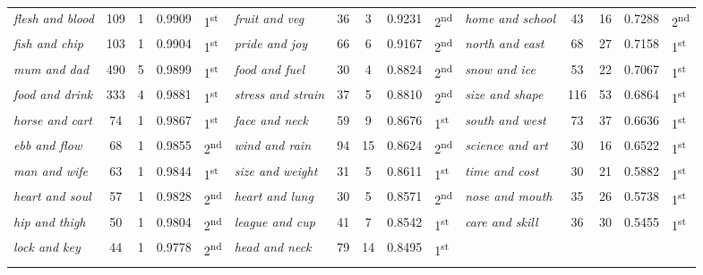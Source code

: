 \begin{table}
{\begin{tabular}[t]{l *{2}{S[table-format=3]} S[table-format=1.4] l  l *{2}{S[table-format=3]} S[table-format=1.4] l  l *{2}{S[table-format=3]} S[table-format=1.4] l}
\textit{flesh and blood} & 109 & 1 & 0.9909 & 1\textsuperscript{st} & \textit{fruit and veg} & 36 & 3 & 0.9231 & 2\textsuperscript{nd} & \textit{home and school} & 43 & 16 & 0.7288 & 2\textsuperscript{nd} \\
\textit{fish and chip} & 103 & 1 & 0.9904 & 1\textsuperscript{st} & \textit{pride and joy} & 66 & 6 & 0.9167 & 2\textsuperscript{nd} & \textit{north and east} & 68 & 27 & 0.7158 & 1\textsuperscript{st} \\
\textit{mum and dad} & 490 & 5 & 0.9899 & 1\textsuperscript{st} & \textit{food and fuel} & 30 & 4 & 0.8824 & 2\textsuperscript{nd} & \textit{snow and ice} & 53 & 22 & 0.7067 & 1\textsuperscript{st} \\
\textit{food and drink} & 333 & 4 & 0.9881 & 1\textsuperscript{st} & \textit{stress and strain} & 37 & 5 & 0.8810 & 2\textsuperscript{nd} & \textit{size and shape} & 116 & 53 & 0.6864 & 1\textsuperscript{st} \\
\textit{horse and cart} & 74 & 1 & 0.9867 & 1\textsuperscript{st} & \textit{face and neck} & 59 & 9 & 0.8676 & 1\textsuperscript{st} & \textit{south and west} & 73 & 37 & 0.6636 & 1\textsuperscript{st} \\
\textit{ebb and flow} & 68 & 1 & 0.9855 & 2\textsuperscript{nd} & \textit{wind and rain} & 94 & 15 & 0.8624 & 2\textsuperscript{nd} & \textit{science and art} & 30 & 16 & 0.6522 & 1\textsuperscript{st} \\
\textit{man and wife} & 63 & 1 & 0.9844 & 1\textsuperscript{st} & \textit{size and weight} & 31 & 5 & 0.8611 & 1\textsuperscript{st} & \textit{time and cost} & 30 & 21 & 0.5882 & 1\textsuperscript{st} \\
\textit{heart and soul} & 57 & 1 & 0.9828 & 2\textsuperscript{nd} & \textit{heart and lung} & 30 & 5 & 0.8571 & 2\textsuperscript{nd} & \textit{nose and mouth} & 35 & 26 & 0.5738 & 1\textsuperscript{st} \\
\textit{hip and thigh} & 50 & 1 & 0.9804 & 2\textsuperscript{nd} & \textit{league and cup} & 41 & 7 & 0.8542 & 1\textsuperscript{st} & \textit{care and skill} & 36 & 30 & 0.5455 & 1\textsuperscript{st} \\
\textit{lock and key} & 44 & 1 & 0.9778 & 2\textsuperscript{nd} & \textit{head and neck} & 79 & 14 & 0.8495 & 1\textsuperscript{st} & & & & & \\
\lspbottomrule
{} \\ %
\end{tabular}}
\end{table}

